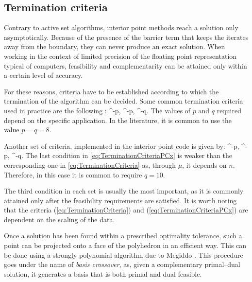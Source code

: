 %
%
\subsection{Termination criteria}

Contrary to active set algorithms, interior point methods reach a
solution only asymptotically. 
Because of the presence of the barrier term that keeps the iterates
away from the boundary, they can never produce an exact solution.
When working in the context of limited precision of the
floating point representation typical of computers, feasibility and
complementarity can be attained only within a certain level
of accuracy.

For these reasons, criteria have to be established according
to which the termination of the algorithm can be decided.
Some common termination criteria used in practice are the
following \cite{GondzioTerlaky}:
\be  \label{eq:TerminationCriteria}
  ^{-p}, 
\qquad
{}  ^{-p},
\qquad
{}  ^{-q}.
\ee
The values of $p$ and $q$ required depend on the specific application.
In the literature, it is common to use the value $p = q = 8$.

Another set of criteria, implemented in the interior point code
\PCx \cite{PCx} is given by:
\be  \label{eq:TerminationCriteriaPCx}
 ^{-p},
\qquad
{} ^{-p},
\qquad
{} ^{-q}.
\ee
The last condition in \eqref{eq:TerminationCriteriaPCx} is weaker
than the corresponding one in \eqref{eq:TerminationCriteria} as,
through $\mu$, it depends on $n$. Therefore, in this case it is common to 
require $q = 10$.

The third condition in each set is usually the most important, as it is
commonly attained only after the feasibility requirements are satisfied.
It is worth noting that the criteria (\ref{eq:TerminationCriteria})
and (\ref{eq:TerminationCriteriaPCx})
are dependent on the scaling of the data.

Once a solution has been found within a prescribed 
optimality tolerance, such a point can be projected onto a face 
of the polyhedron in an efficient way.
This can be done using a strongly polynomial algorithm due
to Megiddo \cite{Megiddo91}. This procedure goes under the name
of {\em basis crossover}, 
as, given a complementary primal--dual solution, it generates a basis 
that is both primal and dual feasible.

